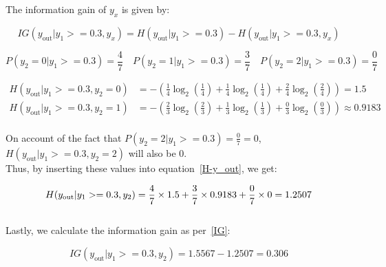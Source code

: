 \documentclass[12pt]{article}
\begin{document}
\begin{enumerate}[leftmargin=\labelsep]
The information gain of $y_x$ is given by:

\begin{equation}\label{IG}
    IG(y_{\text{out}} | y_1 >= 0.3, y_x) = H(y_{\text{out}} | y_1 >= 0.3) - H(y_{\text{out}} | y_1 >= 0.3, y_x)
\end{equation}

\vspace{0.2cm}

\begin{equation*}
    P(y_2 = 0 | y_1 >= 0.3) = \frac{4}{7} \quad
    P(y_2 = 1 | y_1 >= 0.3) = \frac{3}{7} \quad
    P(y_2 = 2 | y_1 >= 0.3) = \frac{0}{7} \quad
\end{equation*}

\begin{equation*}
    \begin{aligned}
        H(y_{\text{out}} | y_1 >= 0.3, y_2 = 0) &= - \left( \frac{1}{4} \log_2 \left( \frac{1}{4} \right) + \frac{1}{4} \log_2 \left( \frac{1}{4} \right) + \frac{2}{4} \log_2 \left( \frac{2}{4} \right) \right) = 1.5
        \\
        H(y_{\text{out}} | y_1 >= 0.3, y_2 = 1) &= - \left( \frac{2}{3} \log_2 \left( \frac{2}{3} \right) + \frac{1}{3} \log_2 \left( \frac{1}{3} \right) + \frac{0}{3} \log_2 \left( \frac{0}{3} \right) \right) \approx 0.9183
        \\
    \end{aligned}
\end{equation*}

\newpage

\begin{flushleft}
    On account of the fact that $P(y_2 = 2 | y_1 >= 0.3) = \frac{0}{7} = 0$, $H(y_{\text{out}} | y_1 >= 0.3, y_2 = 2)$ will also be 0.\\
    \vspace{1em}
    Thus, by inserting these values into equation~\eqref{H-y_out}, we get:
\end{flushleft}

\begin{equation*}
    H(y_{\text{out}} | y_1 >= 0.3, y_2) = \frac{4}{7} \times 1.5 + \frac{3}{7} \times 0.9183 + \frac{0}{7} \times 0 = 1.2507
    \\
\end{equation*}
\\
Lastly, we calculate the information gain as per~\eqref{IG}:

\begin{equation*}
    IG(y_{\text{out}} | y_1 >= 0.3, y_2) = 1.5567 - 1.2507 = 0.306
\end{equation*}


\end{enumerate}
\end{document}
